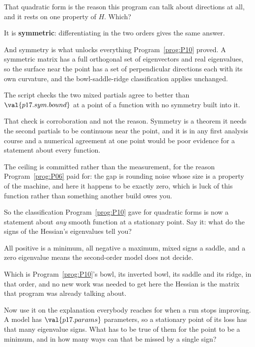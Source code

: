 \begin{fr}
That quadratic form is the reason this program can talk about directions at
all, and it rests on one property of $H$. Which?
\nextframe
\end{fr}

\begin{fr}
\begin{ansblock}
It is \textbf{symmetric}: differentiating in the two orders gives the same
answer.
\end{ansblock}

And symmetry is what unlocks everything Program~\ref{prog:P10} proved. A
symmetric matrix has a full orthogonal set of eigenvectors and real
eigenvalues, so the surface near the point has a set of perpendicular
directions each with its own curvature, and the bowl-saddle-ridge
classification applies unchanged.

The script checks the two mixed partials agree to better than
$\val{p17.sym.bound}$ at a point of a function with no symmetry built into it.

\begin{note}
That check is corroboration and not the reason. Symmetry is a theorem
\dash{} it needs the second partials to be continuous near the point, and it
is in any first analysis course \dash{} and a numerical agreement at one point
would be poor evidence for a statement about every function.

The ceiling is committed rather than the measurement, for the reason
Program~\ref{prog:P06} paid for: the gap is rounding noise whose size is a
property of the machine, and here it happens to be exactly zero, which is
luck of this function rather than something another build owes you.
\end{note}
\end{fr}

\begin{fr}
So the classification Program~\ref{prog:P10} gave for quadratic forms is now a
statement about \emph{any} smooth function at a stationary point. Say it: what
do the signs of the Hessian's eigenvalues tell you?
\dotline
\nextframe
\end{fr}

\begin{fr}
\begin{ansblock}
All positive is a minimum, all negative a maximum, mixed signs a saddle, and a
zero eigenvalue means the second-order model does not decide.
\end{ansblock}

Which is Program~\ref{prog:P10}'s bowl, its inverted bowl, its saddle and its
ridge, in that order, and no new work was needed to get here \dash{} the
Hessian is the matrix that program was already talking about.

Now use it on the explanation everybody reaches for when a run stops
improving. A model has $\val{p17.params}$ parameters, so a stationary point of
its loss has that many eigenvalue signs. What has to be true of them for the
point to be a minimum, and in how many ways can that be missed by a single
sign?
\dotline
\nextframe
\end{fr}

